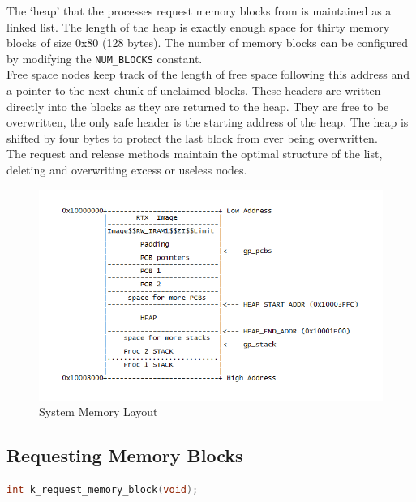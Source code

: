 \documentclass[12pt]{report}
\begin{document}
The `heap' that the processes request memory blocks from is maintained as a linked list. The length of the heap is exactly enough space for thirty memory blocks of size 0x80 (128 bytes). The number of memory blocks can be configured by modifying the {\tt NUM\_BLOCKS} constant.\\

Free space nodes keep track of the length of free space following this address and a pointer to the next chunk of unclaimed blocks. These headers are written directly into the blocks as they are returned to the heap. They are free to be overwritten, the only safe header is the starting address of the heap. The heap is shifted by four bytes to protect the last block from ever being overwritten. \\

The request and release methods maintain the optimal structure of the list, deleting and overwriting excess or useless nodes.\\

\begin{figure}
	\includegraphics{memory.png}
\caption{System Memory Layout}

\end{figure}

\subsection{Requesting Memory Blocks}

\begin{minipage}{\textwidth}
\begin{lstlisting}[language=C, frame=single]
int k_request_memory_block(void);
\end{lstlisting}
\end{minipage}
\end{document}
